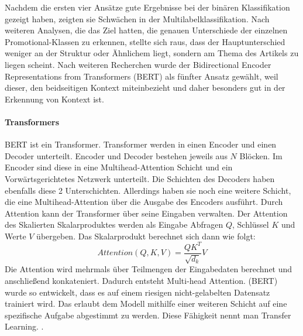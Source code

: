 Nachdem die ersten vier Ansätze gute Ergebnisse bei der binären Klassifikation gezeigt haben, zeigten sie Schwächen in der Multilabelklassifikation. Nach weiteren Analysen, die das Ziel hatten, die genauen Unterschiede der einzelnen Promotional-Klassen zu erkennen, stellte sich raus, dass der Hauptunterschied weniger an der Struktur oder Ähnlichem liegt, sondern am Thema des Artikels zu liegen scheint. Nach weiteren Recherchen wurde der Bidirectional Encoder Representations from Transformers (BERT) als fünfter Ansatz gewählt, weil dieser, den beidseitigen Kontext miteinbezieht und daher besonders gut in der Erkennung von Kontext ist.
\paragraph{Transformers}
BERT ist ein Transformer. Transformer werden in einen Encoder und einen Decoder unterteilt. Encoder und Decoder bestehen jeweils aus $N$ Blöcken. Im Encoder sind diese in eine Multihead-Attention Schicht und ein Vorwärtsgerichtetes Netzwerk unterteilt. Die Schichten des Decoders haben ebenfalls diese 2 Unterschichten. Allerdings haben sie noch eine weitere Schicht, die eine Multihead-Attention über die Ausgabe des Encoders ausführt. Durch Attention kann der Transformer über seine Eingaben verwalten. Der Attention des Skalierten Skalarproduktes werden als Eingabe Abfragen $Q$, Schlüssel $K$ und Werte $V$ übergeben. Das Skalarprodukt berechnet sich dann wie folgt:
$${Attention(Q,K,V)} = {\frac{QK^T}{\sqrt{d_k}} V}$$
Die Attention wird mehrmals über Teilmengen der Eingabedaten berechnet und anschließend konkateniert. Dadurch entsteht Multi-head Attention. \cite{Vaswani2017}
(BERT) wurde so entwickelt, dass es auf einem riesigen nicht-gelabelten Datensatz trainiert wird. Das erlaubt dem Modell mithilfe einer weiteren Schicht auf eine spezifische Aufgabe abgestimmt zu werden. Diese Fähigkeit nennt man Transfer Learning. %
\cite{Devlin2018}.

